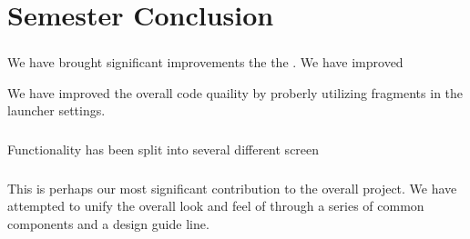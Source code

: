 \chapter{Semester Conclusion}
\label{cha:conclusion_final}

\subsection{\launcher}
We have brought significant improvements the the \launcher. We have improved 


We have improved the overall code quaility by proberly utilizing fragments in the launcher settings.   

\subsection{\ct}

Functionality has been split into several different screen

\subsection{\gc}

This is perhaps our most significant contribution to the overall project. We have attempted to unify the overall look and feel of \giraf through a series of common components and a design guide line. 